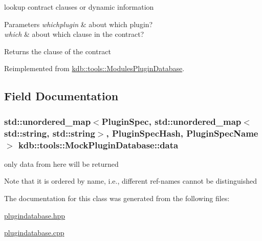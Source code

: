 lookup contract clauses or dynamic information 


\begin{DoxyParams}{Parameters}
{\em whichplugin} & about which plugin? \\
\hline
{\em which} & about which clause in the contract?\\
\hline
\end{DoxyParams}
\begin{DoxyReturn}{Returns}
the clause of the contract 
\end{DoxyReturn}


Reimplemented from \hyperlink{classkdb_1_1tools_1_1ModulesPluginDatabase_a3d06a4b33e4bcc879dd6f562a8876390}{kdb\+::tools\+::\+Modules\+Plugin\+Database}.



\subsection{Field Documentation}
\hypertarget{classkdb_1_1tools_1_1MockPluginDatabase_a5de7756d9e7fb78d53903c92208d7fbe}{
\subsubsection[{data}]{\setlength{\rightskip}{0pt plus 5cm}std\+::unordered\+\_\+map$<${\bf Plugin\+Spec}, std\+::unordered\+\_\+map$<$std\+::string, std\+::string$>$, {\bf Plugin\+Spec\+Hash}, Plugin\+Spec\+Name$>$ kdb\+::tools\+::\+Mock\+Plugin\+Database\+::data\hspace{0.3cm}{\ttfamily [mutable]}}}\label{classkdb_1_1tools_1_1MockPluginDatabase_a5de7756d9e7fb78d53903c92208d7fbe}


only data from here will be returned 

\begin{DoxyNote}{Note}
that it is ordered by name, i.\+e., different ref-\/names cannot be distinguished 
\end{DoxyNote}


The documentation for this class was generated from the following files\+:\begin{DoxyCompactItemize}
\item 
\hyperlink{plugindatabase_8hpp}{plugindatabase.\+hpp}\item 
\hyperlink{plugindatabase_8cpp}{plugindatabase.\+cpp}\end{DoxyCompactItemize}
